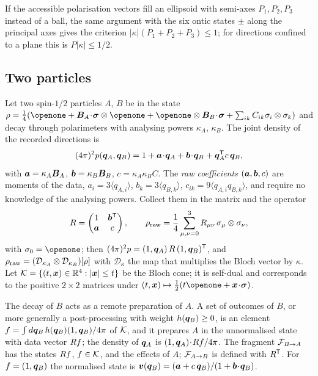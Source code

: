 If the accessible polarisation vectors fill an ellipsoid with semi-axes $P_1,P_2,P_3$ instead of a ball, the same argument with the six ontic states $\pm$ along the principal axes gives the criterion $|\kappa|(P_1+P_2+P_3)\le1$; for directions confined to a plane this is $P|\kappa|\le1/2$.

\subsection{Two particles}
\label{sec:pair}

Let two spin-$1/2$ particles $A$, $B$ be in the state $\rho=\tfrac14(\openone+\bm{B}_A\!\cdot\!\bsig\otimes\openone+\openone\otimes\bm{B}_B\!\cdot\!\bsig+\sum_{ik}C_{ik}\sigma_i\otimes\sigma_k)$ and decay through polarimeters with analysing powers $\kappa_A$, $\kappa_B$. The joint density of the recorded directions is
\begin{equation}
(4\pi)^2p(\bm{q}_A,\bm{q}_B)=1+\bm{a}\!\cdot\!\bm{q}_A+\bm{b}\!\cdot\!\bm{q}_B+\bm{q}_A^{\mathsf{T}}c\,\bm{q}_B ,
\label{eq:pairdata}
\end{equation}
with $\bm{a}=\kappa_A\bm{B}_A$, $\bm{b}=\kappa_B\bm{B}_B$, $c=\kappa_A\kappa_BC$. The \emph{raw coefficients} $(\bm{a},\bm{b},c)$ are moments of the data, $a_i=3\langle q_{A,i}\rangle$, $b_k=3\langle q_{B,k}\rangle$, $c_{ik}=9\langle q_{A,i}q_{B,k}\rangle$, and require no knowledge of the analysing powers. Collect them in the matrix and the operator
\begin{equation}
R=\begin{pmatrix}1&\bm{b}^{\mathsf{T}}\\ \bm{a}&c\end{pmatrix},\qquad
\rho_{\mathrm{raw}}=\frac14\sum_{\mu,\nu=0}^{3}R_{\mu\nu}\,\sigma_\mu\otimes\sigma_\nu ,
\label{eq:rhoraw}
\end{equation}
with $\sigma_0=\openone$; then $(4\pi)^2p=(1,\bm{q}_A)\,R\,(1,\bm{q}_B)^{\mathsf{T}}$, and $\rho_{\mathrm{raw}}=(\mathcal{D}_{\kappa_A}\otimes\mathcal{D}_{\kappa_B})[\rho]$ with $\mathcal{D}_\kappa$ the map that multiplies the Bloch vector by $\kappa$. Let $\mathcal{K}=\{(t,\bm{x})\in\mathbb{R}^4:|\bm{x}|\le t\}$ be the Bloch cone; it is self-dual and corresponds to the positive $2\times2$ matrices under $(t,\bx)\mapsto\tfrac12(t\openone+\bx\!\cdot\!\bsig)$.

The decay of $B$ acts as a remote preparation of $A$. A set of outcomes of $B$, or more generally a post-processing with weight $h(\bm{q}_B)\ge0$, is an element $f=\int d\bm{q}_B\,h(\bm{q}_B)(1,\bm{q}_B)/4\pi$ of $\mathcal{K}$, and it prepares $A$ in the unnormalised state with data vector $R f$; the density of $\bm{q}_A$ is $(1,\bm{q}_A)\!\cdot\!R f/4\pi$. The fragment $\mathcal{F}_{B\to A}$ has the states $R f$, $f\in\mathcal{K}$, and the effects of $A$; $\mathcal{F}_{A\to B}$ is defined with $R^{\mathsf{T}}$. For $f=(1,\bm{q}_B)$ the normalised state is $\bm{v}(\bm{q}_B)=(\bm{a}+c\,\bm{q}_B)/(1+\bm{b}\!\cdot\!\bm{q}_B)$.

